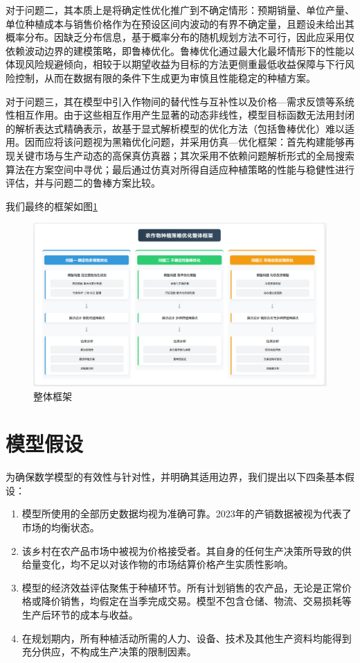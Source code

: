 对于问题二，其本质上是将确定性优化推广到不确定情形：预期销量、单位产量、单位种植成本与销售价格作为在预设区间内波动的有界不确定量，且题设未给出其概率分布。因缺乏分布信息，基于概率分布的随机规划方法不可行，因此应采用仅依赖波动边界的建模策略，即鲁棒优化。鲁棒优化通过最大化最坏情形下的性能以体现风险规避倾向，相较于以期望收益为目标的方法更侧重最低收益保障与下行风险控制，从而在数据有限的条件下生成更为审慎且性能稳定的种植方案。

对于问题三，其在模型中引入作物间的替代性与互补性以及价格—需求反馈等系统性相互作用。由于这些相互作用产生显著的动态非线性，模型目标函数无法用封闭的解析表达式精确表示，故基于显式解析模型的优化方法（包括鲁棒优化）难以适用。因而应将该问题视为黑箱优化问题，并采用仿真—优化框架：首先构建能够再现关键市场与生产动态的高保真仿真器；其次采用不依赖问题解析形式的全局搜索算法在方案空间中寻优；最后通过仿真对所得自适应种植策略的性能与稳健性进行评估，并与问题二的鲁棒方案比较。

我们最终的框架如图\ref{fig:all}

\begin{figure}[htbp]
	\centering
	\includegraphics[width=\textwidth]{figs/1前置/全文框架.png}
	\caption{整体框架}
	\label{fig:all}
\end{figure}


\section{模型假设}


为确保数学模型的有效性与针对性，并明确其适用边界，我们提出以下四条基本假设：

\begin{enumerate}
    \item 模型所使用的全部历史数据均视为准确可靠。2023年的产销数据被视为代表了市场的均衡状态。

    \item 该乡村在农产品市场中被视为价格接受者。其自身的任何生产决策所导致的供给量变化，均不足以对该作物的市场结算价格产生实质性影响。

    \item 模型的经济效益评估聚焦于种植环节。所有计划销售的农产品，无论是正常价格或降价销售，均假定在当季完成交易。模型不包含仓储、物流、交易损耗等生产后环节的成本与收益。

    \item 在规划期内，所有种植活动所需的人力、设备、技术及其他生产资料均能得到充分供应，不构成生产决策的限制因素。

\end{enumerate}


